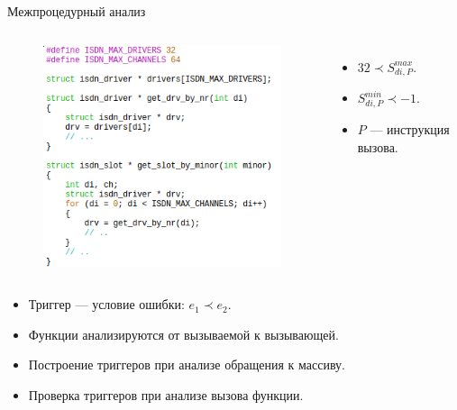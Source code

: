 \documentclass[russian, hyperref={unicode}]{beamer}
\begin{document}
\begin{frame}{Межпроцедурный анализ}
    \begin{columns}
            \begin{figure}
                \includegraphics[width=\textwidth, clip=true]{archer-linux.png}
            \end{figure}
            \begin{itemize}
              \item $32 \prec S^{max}_{di, P}$.
              \item $S^{min}_{di, P} \prec -1$.
              \item $P$ --- инструкция вызова.
            \end{itemize}
    \end{columns}

    \begin{itemize}
      \item Триггер --- условие ошибки: $e_1 \prec e_2$.
      \item Функции анализируются от вызываемой к вызывающей.
      \item Построение триггеров при анализе обращения к массиву.
      \item Проверка триггеров при анализе вызова функции.
    \end{itemize}
\end{frame}
\end{document}
